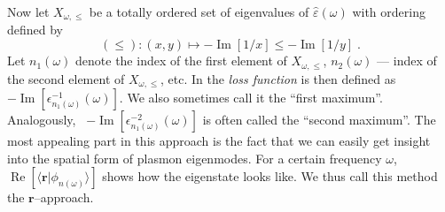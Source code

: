 \documentclass[a4paper,12pt]{article}
\begin{document}
    Now let $X_{\omega,\leq}$ be a totally ordered set of eigenvalues of $\hat\varepsilon(\omega)$ with ordering defined by
    \begin{equation*}
        (\leq)\!: (x, y) \mapsto -\operatorname{Im}[1 / x] \leq -\operatorname{Im}[1 / y] \;.
    \end{equation*}
    Let $n_1(\omega)$ denote the index of the first element of $X_{\omega,\leq}$, $n_2(\omega)$ --- index of the second element of $X_{\omega,\leq}$, etc. In \cite{plasmonic2015} the \textit{loss function} is then defined as \ $-\operatorname{Im}[\epsilon_{n_1(\omega)}^{-1}(\omega)]$. We also sometimes call it the ``first maximum''. Analogously, \ $-\operatorname{Im}[\epsilon_{n_1(\omega)}^{-2}(\omega)]$ is often called the ``second maximum''.
    The most appealing part in this approach is the fact that we can easily get insight into the spatial form of plasmon eigenmodes. For a certain frequency $\omega$, \ $\operatorname{Re}[\langle\mathbf{r}|\phi_{n(\omega)}\rangle]$ shows how the eigenstate looks like. We thus call this method the $\mathbf{r}$--approach.
\end{document}
